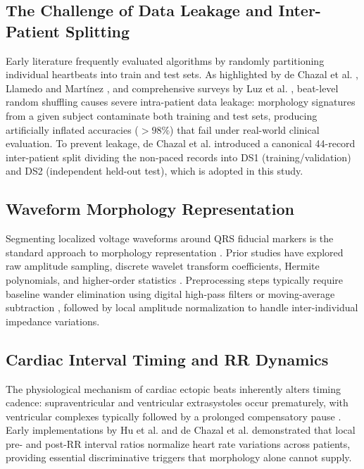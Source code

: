 \documentclass[conference]{IEEEtran}
\begin{document}
\subsection{The Challenge of Data Leakage and Inter-Patient Splitting}
Early literature frequently evaluated algorithms by randomly partitioning individual heartbeats into train and test sets. As highlighted by de Chazal et al. \cite{dechazal2004automatic}, Llamedo and Mart{\'i}nez \cite{llamedo2011heartbeat}, and comprehensive surveys by Luz et al. \cite{luz2016ecg}, beat-level random shuffling causes severe intra-patient data leakage: morphology signatures from a given subject contaminate both training and test sets, producing artificially inflated accuracies ($>98\%$) that fail under real-world clinical evaluation. To prevent leakage, de Chazal et al. \cite{dechazal2004automatic} introduced a canonical 44-record inter-patient split dividing the non-paced records into DS1 (training/validation) and DS2 (independent held-out test), which is adopted in this study.

\subsection{Waveform Morphology Representation}
Segmenting localized voltage waveforms around QRS fiducial markers is the standard approach to morphology representation \cite{kohler2002principles}. Prior studies have explored raw amplitude sampling, discrete wavelet transform coefficients, Hermite polynomials, and higher-order statistics \cite{luz2016ecg}. Preprocessing steps typically require baseline wander elimination using digital high-pass filters or moving-average subtraction \cite{sornmo2005bioelectrical}, followed by local amplitude normalization to handle inter-individual impedance variations.

\subsection{Cardiac Interval Timing and RR Dynamics}
The physiological mechanism of cardiac ectopic beats inherently alters timing cadence: supraventricular and ventricular extrasystoles occur prematurely, with ventricular complexes typically followed by a prolonged compensatory pause \cite{josephson2015clinical}. Early implementations by Hu et al. \cite{hu1997patient} and de Chazal et al. \cite{dechazal2004automatic} demonstrated that local pre- and post-RR interval ratios normalize heart rate variations across patients, providing essential discriminative triggers that morphology alone cannot supply.
\end{document}
